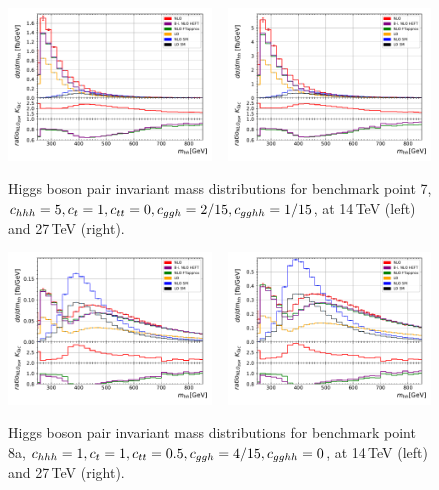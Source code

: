 \begin{figure}[htb]
\includegraphics[width=0.48\textwidth]{section3/plots/Ben_7_mhh.pdf}
~
 \includegraphics[width=0.48\textwidth]{section3/plots/Ben_7_mhh_27TeV.pdf}
\caption{Higgs boson pair invariant mass distributions  for benchmark point 7, $c_{hhh}=5,c_{t}= 1, c_{tt}=0, c_{ggh}=2/15,c_{gghh}=1/15$, at 14\,TeV (left) and 27\,TeV (right).}
\label{fig:benchmark7}
\end{figure}
%
\begin{figure}[htb]
  \centering
  \includegraphics[width=0.48\textwidth]{section3/plots/Ben_8a_mhh.pdf} 
~
\includegraphics[width=0.48\textwidth]{section3/plots/Ben_8a_mhh_27TeV.pdf}
\caption{Higgs boson pair invariant mass distributions  for benchmark point 8a, $c_{hhh}=1,c_{t}= 1, c_{tt}=0.5, c_{ggh}=4/15,c_{gghh}=0$, at 14\,TeV (left) and 27\,TeV (right).}
\label{fig:benchmark8a}
\end{figure}
%



